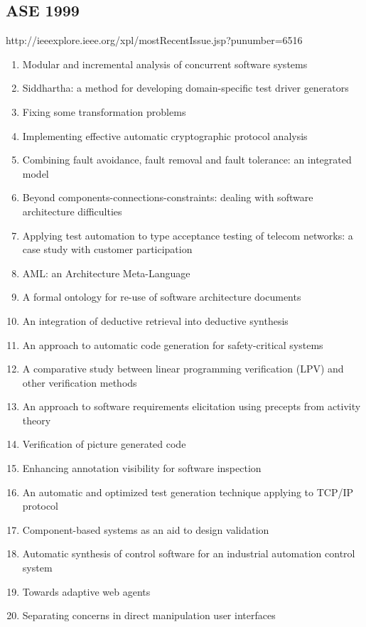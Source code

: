 \subsection{ASE 1999}

http://ieeexplore.ieee.org/xpl/mostRecentIssue.jsp?punumber=6516

\begin{enumerate}[itemsep=-1ex]
  \item Modular and incremental analysis of concurrent software systems
  \item Siddhartha: a method for developing domain-specific test driver generators
  \item Fixing some transformation problems
  \item Implementing effective automatic cryptographic protocol analysis
  \item Combining fault avoidance, fault removal and fault tolerance: an integrated model
  \item Beyond components-connections-constraints: dealing with software architecture difficulties
  \item Applying test automation to type acceptance testing of telecom networks: a case study with customer participation
  \item AML: an Architecture Meta-Language
  \item A formal ontology for re-use of software architecture documents
  \item An integration of deductive retrieval into deductive synthesis
  \item An approach to automatic code generation for safety-critical systems
  \item A comparative study between linear programming verification (LPV) and other verification methods
  \item An approach to software requirements elicitation using precepts from activity theory
  \item Verification of picture generated code
  \item Enhancing annotation visibility for software inspection
  \item An automatic and optimized test generation technique applying to TCP/IP protocol
  \item Component-based systems as an aid to design validation
  \item Automatic synthesis of control software for an industrial automation control system
  \item Towards adaptive web agents
  \item Separating concerns in direct manipulation user interfaces

\end{enumerate}
